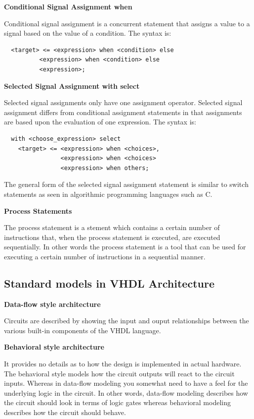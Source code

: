 \textbf{Conditional Signal Assignment when}

Conditional signal assignment is a concurrent statement that assigns a value to a signal based on the value of a condition. The syntax is:

\begin{verbatim}
  <target> <= <expression> when <condition> else 
          <expression> when <condition> else 
          <expression>;
\end{verbatim}

\textbf{Selected Signal Assignment with select}

Selected signal assignments only have one assignment operator. Selected signal assignment
differs from conditional assignment statements in that assignments are based upon the evaluation
of one expression. The syntax is:

\begin{verbatim}
  with <choose_expression> select
    <target> <= <expression> when <choices>,
                <expression> when <choices>
                <expression> when others;
\end{verbatim}

The general form of the selected signal assignment statement is similar to switch statements
as seen in algorithmic programming languages such as C.

\textbf{Process Statements}

The process statement is a stement which contains a certain number of instructions that, when the process statement
is executed, are executed sequentially. In other words the process statement is a tool that can be used
for executing a certain number of instructions in a sequential manner.

\newpage
\subsection{Standard models in VHDL Architecture}


\textbf{Data-flow style architecture}

Circuits are described by showing the input and ouput relationships between the various built-in components of the VHDL language.

\textbf{Behavioral style architecture}

It provides no details as to how the design is implemented in actual hardware.
The behavioral style models how the circuit outputs will react to the circuit inputs.
Whereas in data-flow modeling you somewhat need to have a feel for the underlying logic in the circuit.
In other words, data-flow modeling describes how the circuit should look in terms of logic gates
whereas behavioral modeling describes how the circuit should behave.
